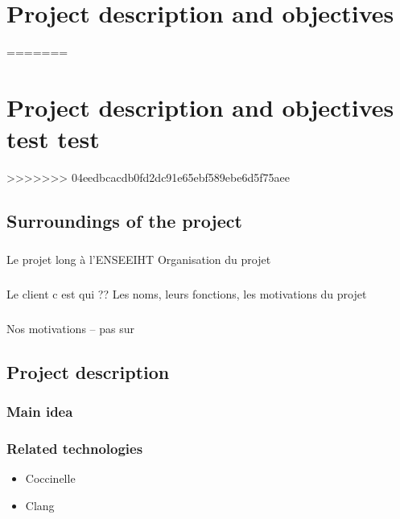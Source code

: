 \documentclass{report}
\begin{document}
\chapter{Project description and objectives}
=======
\chapter{Project description and objectives test test}
>>>>>>> 04eedbcacdb0fd2dc91e65ebf589ebe6d5f75aee

\section{Surroundings of the project}

\paragraph{}
\hspace{4mm}\textnormal{Le projet long \`{a} l'ENSEEIHT
	Organisation du projet}

\paragraph{}
\hspace{4mm}\textnormal{Le client c est qui ?? Les noms, leurs fonctions, les motivations du projet}

\paragraph{}
\hspace{4mm}\textnormal{Nos motivations -- pas sur}

\section{Project description}

\subsection{Main idea}

\subsection{Related technologies}

\vspace{4mm}
\begin{itemize}
\item Coccinelle\vspace{1mm}
\item Clang\vspace{1mm}
\end{itemize}
\end{document}
